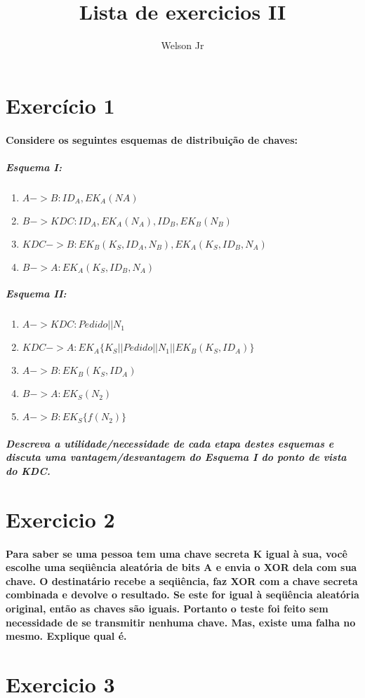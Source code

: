 \documentclass[10pt,a4paper]{report}
\author{Welson Jr}
\title{Lista de exercicios II}
\begin{document}
\section*{Exercício 1} 
\paragraph{ Considere os seguintes esquemas de distribuição de chaves:}
\subparagraph{ Esquema I:}
\begin{enumerate}[(1)]
\item $A -> B: ID_A, EK_A(NA)$
\item $B -> KDC: ID_A, EK_A(N_A), ID_B, EK_B(N_B)$
\item $KDC -> B: EK_B(K_S, ID_A, N_B), EK_A(K_S, ID_B, N_A)$
\item $B -> A: EK_A(K_S, ID_B, N_A)$
\end{enumerate}
\subparagraph{ Esquema II:}
\begin{enumerate}[(1)]
\item $A -> KDC: Pedido || N_1$
\item $KDC -> A: EK_A\{K_S || Pedido || N_1 || EK_B(K_S, ID_A)\}$
\item $A -> B: EK_B(K_S, ID_A)$
\item $B -> A: EK_S(N_2)$
\item $A -> B: EK_S\{ f(N_2) \}$
\end{enumerate}
\subparagraph{
Descreva a utilidade/necessidade de cada etapa destes esquemas e discuta uma vantagem/desvantagem do Esquema I do ponto de vista do KDC.}

\section*{Exercicio 2}
\paragraph{Para saber se uma pessoa tem uma chave secreta K igual à sua, você escolhe uma seqüência aleatória de bits A e envia o XOR dela com sua chave. O destinatário recebe a seqüência, faz XOR com a chave secreta combinada e devolve o resultado. Se este for igual à seqüência aleatória original, então as chaves são iguais. Portanto o teste foi feito sem necessidade de se transmitir nenhuma chave. Mas, existe uma falha no mesmo. Explique qual é.}

\section*{Exercicio 3}
\end{document}
